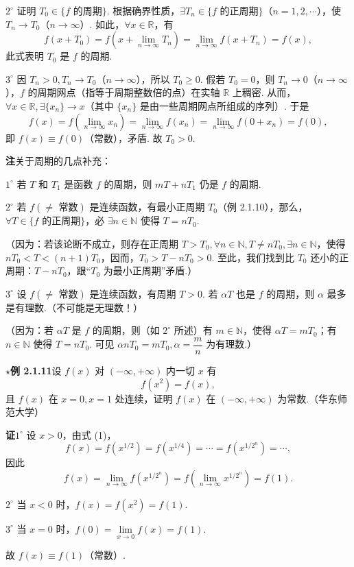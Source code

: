 \documentclass[UTF8,12pt,a4paper,fontset=fandol]{ctexart}
\begin{document}
$2^\circ$ 证明 $T_0\in\{f\text{ 的周期}\}$. 根据确界性质，$\exists T_n\in\{f\text{ 的正周期}\}$（$n=1,2,\cdots$），使 $T_n\to T_0$（$n\to\infty$）. 如此，$\forall x\in\mathbb{R}$，有
\[
  f(x+T_0)=f\left(x+\lim_{n\to\infty}T_n\right)
  =\lim_{n\to\infty}f(x+T_n)=f(x),
\]
此式表明 $T_0$ 是 $f$ 的周期.

$3^\circ$ 因 $T_n>0,T_n\to T_0$（$n\to\infty$），所以 $T_0\ge0$. 假若 $T_0=0$，则 $T_n\to0$（$n\to\infty$），$f$ 的周期网点（指等于周期整数倍的点）在实轴 $\mathbb{R}$ 上稠密. 从而，$\forall x\in\mathbb{R},\exists\{x_n\}\to x$（其中 $\{x_n\}$ 是由一些周期网点所组成的序列）. 于是
\[
  f(x)=f\left(\lim_{n\to\infty}x_n\right)=\lim_{n\to\infty}f(x_n)
  =\lim_{n\to\infty}f(0+x_n)=f(0),
\]
即 $f(x)\equiv f(0)$（常数），矛盾. 故 $T_0>0$.

\noindent\textbf{注}\quad 关于周期的几点补充：

$1^\circ$ 若 $T$ 和 $T_1$ 是函数 $f$ 的周期，则 $mT+nT_1$ 仍是 $f$ 的周期.

$2^\circ$ 若 $f(\ne\text{ 常数})$ 是连续函数，有最小正周期 $T_0$（例 2.1.10），那么，$\forall T\in\{f\text{ 的正周期}\}$，必 $\exists n\in\mathbb{N}$ 使得 $T=nT_0$.

（因为：若该论断不成立，则存在正周期 $T>T_0,\forall n\in\mathbb{N},T\ne nT_0,\exists n\in\mathbb{N}$，使得 $nT_0<T<(n+1)T_0$，因而，$T_0>T-nT_0>0$. 至此，我们找到比 $T_0$ 还小的正周期：$T-nT_0$，跟“$T_0$ 为最小正周期”矛盾.）

$3^\circ$ 设 $f(\ne\text{ 常数})$ 是连续函数，有周期 $T>0$. 若 $\alpha T$ 也是 $f$ 的周期，则 $\alpha$ 最多是有理数.（不可能是无理数！）

（因为：若 $\alpha T$ 是 $f$ 的周期，则（如 $2^\circ$ 所述）有 $m\in\mathbb{N}$，使得 $\alpha T=mT_0$；有 $n\in\mathbb{N}$ 使得 $T=nT_0$. 可见 $\alpha nT_0=mT_0,\alpha=\dfrac mn$ 为有理数.）

\noindent\textbf{$\star$例 2.1.11}\quad 设 $f(x)$ 对 $(-\infty,+\infty)$ 内一切 $x$ 有
\[
  f(x^2)=f(x),
\tag{1}
\]
且 $f(x)$ 在 $x=0,x=1$ 处连续，证明 $f(x)$ 在 $(-\infty,+\infty)$ 为常数.（华东师范大学）

\noindent\textbf{证}\quad $1^\circ$ 设 $x>0$，由式 (1)，
\[
  f(x)=f(x^{1/2})=f(x^{1/4})=\cdots=f(x^{1/2^n})=\cdots,
\]
因此
\[
  f(x)=\lim_{n\to\infty}f(x^{1/2^n})
  =f\left(\lim_{n\to\infty}x^{1/2^n}\right)=f(1).
\]

$2^\circ$ 当 $x<0$ 时，$f(x)=f(x^2)=f(1)$.

$3^\circ$ 当 $x=0$ 时，$f(0)=\lim\limits_{x\to0}f(x)=f(1)$.

故 $f(x)\equiv f(1)$（常数）.
\end{document}
